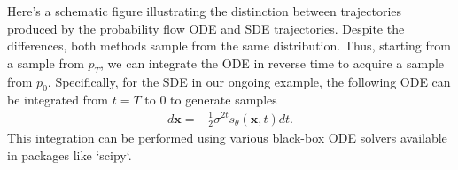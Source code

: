 \documentclass{article}
\begin{document}
Here's a schematic figure illustrating the distinction between trajectories produced by the probability flow ODE and SDE trajectories. Despite the differences, both methods sample from the same distribution. Thus, starting from a sample from $p_T$, we can integrate the ODE in reverse time to acquire a sample from $p_0$. Specifically, for the SDE in our ongoing example, the following ODE can be integrated from $t=T$ to $0$ to generate samples
\begin{align*}
d\mathbf{x} =  -\frac{1}{2}\sigma^{2t} s_\theta(\mathbf{x}, t) dt.
\end{align*}
This integration can be performed using various black-box ODE solvers available in packages like `scipy`.
	


		
\end{document}
